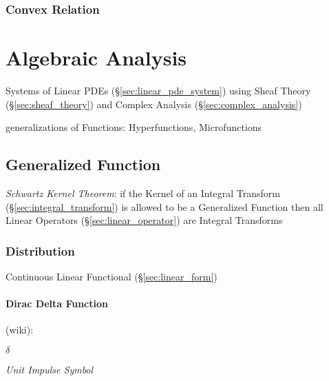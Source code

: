 \subsubsection{Convex Relation}\label{sec:convex_relation}



\section{Algebraic Analysis}\label{sec:algebraic_analysis}

Systems of Linear PDEs (\S\ref{sec:linear_pde_system}) using Sheaf Theory
(\S\ref{sec:sheaf_theory}) and Complex Analysis (\S\ref{sec:complex_analysis})

generalizations of Functions: Hyperfunctions, Microfunctions



\subsection{Generalized Function}\label{sec:generalized_function}

\emph{Schwartz Kernel Theorem}: if the Kernel of an Integral Transform
(\S\ref{sec:integral_transform}) is allowed to be a Generalized Function then
all Linear Operators (\S\ref{sec:linear_operator}) are Integral Transforms



\subsubsection{Distribution}\label{sec:distribution}

Continuous Linear Functional (\S\ref{sec:linear_form})



\paragraph{Dirac Delta Function}\label{sec:dirac_delta}\hfill

(wiki):

$\delta$

\emph{Unit Impulse Symbol}


